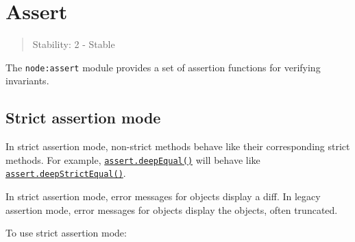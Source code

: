 \section{Assert}\label{assert}

\begin{quote}
Stability: 2 - Stable
\end{quote}

The \texttt{node:assert} module provides a set of assertion functions
for verifying invariants.

\subsection{Strict assertion mode}\label{strict-assertion-mode}

In strict assertion mode, non-strict methods behave like their
corresponding strict methods. For example,
\hyperref[assertdeepequalactual-expected-message]{\texttt{assert.deepEqual()}}
will behave like
\hyperref[assertdeepstrictequalactual-expected-message]{\texttt{assert.deepStrictEqual()}}.

In strict assertion mode, error messages for objects display a diff. In
legacy assertion mode, error messages for objects display the objects,
often truncated.

To use strict assertion mode:

\begin{Shaded}
\begin{Highlighting}[]
 \OperatorTok{;}
\end{Highlighting}
\end{Shaded}

\begin{Shaded}
\begin{Highlighting}[]
\OperatorTok{=} \NormalTok{(}\NormalTok{)}\OperatorTok{;}
\end{Highlighting}
\end{Shaded}

\begin{Shaded}
\begin{Highlighting}[]
 \OperatorTok{;}
\end{Highlighting}
\end{Shaded}

